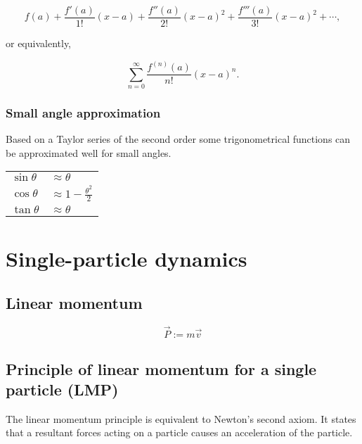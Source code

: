 \documentclass[10pt,a4paper]{scrartcl}
\begin{document}
\begin{multicols*}{2}
\begin{equation*}
f(a)+\frac{f'(a)}{1!}(x-a)+\frac{f''(a)}{2!}(x-a)^2+\frac{f'''(a)}{3!}(x-a)^2+\cdots,
\end{equation*}

or equivalently,

\begin{equation*}
\sum\limits_{n=0}^\infty \frac{f^{(n)}(a)}{n!}(x-a)^n.
\end{equation*}

\subsubsection{Small angle approximation}

Based on a Taylor series of the second order some trigonometrical functions can be approximated well for small angles.

\begin{center}
\begin{tabular}{l@{$\;$}l}
$\sin\theta$&$\approx\theta$\\
$\cos\theta$&$\approx1-\frac{\theta^2}{2}$\\
$\tan\theta$&$\approx\theta$
\end{tabular}
\end{center}

\section{Single-particle dynamics}

\subsection{Linear momentum}

\begin{equation*}
\vec{P}:=m\vec{v}
\end{equation*}


\subsection{Principle of linear momentum for a single particle (LMP)}
The linear momentum principle is equivalent to Newton's second axiom. It states that a resultant forces acting on a particle causes an acceleration of the particle.


\end{multicols*}
\end{document}
